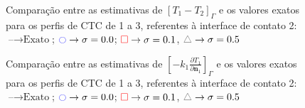 \begin{figure}[h!b]
	\caption{Comparação entre as estimativas de $[T_1 - T_2]_\Gamma$ e os valores exatos para os perfis de CTC de 1 a 3, referentes à interface de contato 2: $\text{--} \rightarrow \text{Exato}$; $\textcolor{blue}{\ocircle} \rightarrow \sigma = 0.0$; $\textcolor{red}{\square} \rightarrow \sigma = 0.1$, $\textcolor{gray}{\triangle} \rightarrow \sigma = 0.5$}
\end{figure}
%
%
\begin{figure}[h!b]
	\caption{Comparação entre as estimativas de $\left[-k_1 \frac{\partial T_1}{\partial\mathbf{n}_1}\right]_\Gamma$ e os valores exatos para os perfis de CTC de 1 a 3, referentes à interface de contato 2: $\text{--} \rightarrow \text{Exato}$; $\textcolor{blue}{\ocircle} \rightarrow \sigma = 0.0$; $\textcolor{red}{\square} \rightarrow \sigma = 0.1$, $\textcolor{gray}{\triangle} \rightarrow \sigma = 0.5$}
\end{figure}
%
